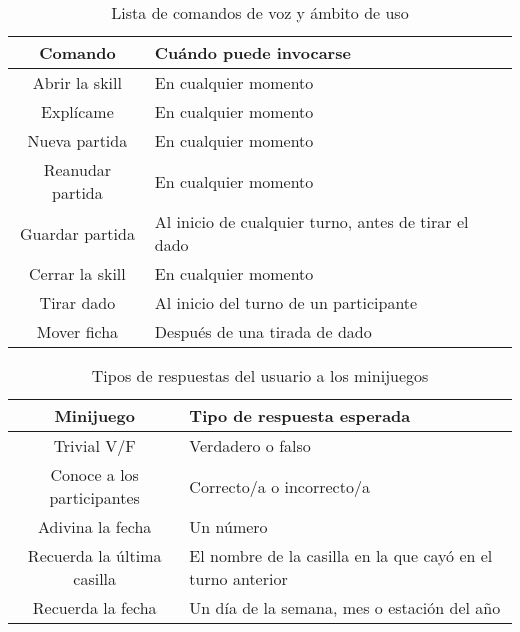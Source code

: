 \begin{table}[H]
	\centering
	\begin{tabular}{|c|p{7cm}|}
		\hline
		\rowcolor{lightgray}
		\textbf{Comando} & \textbf{Cuándo puede invocarse}\\
		\hline
		Abrir la skill & En cualquier momento \\
		\hline
		Explícame & En cualquier momento \\
		\hline
		Nueva partida & En cualquier momento \\
		\hline
		Reanudar partida & En cualquier momento \\
		\hline
		Guardar partida & Al inicio de cualquier turno, antes de tirar el dado \\
		\hline
		Cerrar la skill & En cualquier momento \\
		\hline
		Tirar dado & Al inicio del turno de un participante \\
		\hline
		Mover ficha & Después de una tirada de dado \\
		\hline
	\end{tabular}
	\caption{Lista de comandos de voz y ámbito de uso}
	\label{tab:comandos-voz}
\end{table}

\begin{table}[H]
	\centering
	\begin{tabular}{|c|p{7cm}|}
		\hline
		\rowcolor{lightgray}
		\textbf{Minijuego} & \textbf{Tipo de respuesta esperada}\\
		\hline
		Trivial V/F & Verdadero o falso \\
		\hline
		Conoce a los participantes & Correcto/a o incorrecto/a \\
		\hline
		Adivina la fecha & Un número \\
		\hline
		Recuerda la última casilla & El nombre de la casilla en la que cayó en el turno anterior \\
		\hline
		Recuerda la fecha & Un día de la semana, mes o estación del año \\
		\hline
	\end{tabular}
	\caption{Tipos de respuestas del usuario a los minijuegos}
	\label{tab:respuestas-minijuegos}
\end{table}


